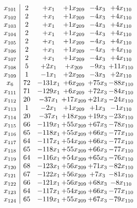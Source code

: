 \documentclass[11pt]{article}
\begin{document}
\[\begin{array}{c| c c@{\hskip 2pt} c@{\hskip 2pt} c@{\hskip 2pt} c@{\hskip 2pt} }
 x_{101}   &  2 & +  x_{1} & + 1 x_{209} & -4 x_{3} & + 4 x_{110}\\
 x_{102}   &  2 & +  x_{1} & + 1 x_{209} & -4 x_{3} & + 4 x_{110}\\
 x_{103}   &  2 & +  x_{1} & + 1 x_{209} & -4 x_{3} & + 4 x_{110}\\
 x_{104}   &  2 & +  x_{1} & + 1 x_{209} & -4 x_{3} & + 4 x_{110}\\
 x_{105}   &  2 & +  x_{1} & + 1 x_{209} & -4 x_{3} & + 4 x_{110}\\
 x_{106}   &  2 & +  x_{1} & + 1 x_{209} & -4 x_{3} & + 4 x_{110}\\
 x_{107}   &  2 & +  x_{1} & + 1 x_{209} & -4 x_{3} & + 4 x_{110}\\
 x_{108}   &  5 & + 2 x_{1} & +  x_{209} & -9 x_{3} & + 11 x_{110}\\
 x_{109}   &  1 & -1 x_{1} & + 2 x_{209} & -3 x_{3} & + 2 x_{110}\\
 x_{6}   &  72 & -131 x_{1} & + 6 x_{209} & + 75 x_{3} & -88 x_{110}\\
 x_{111}   &  71 & -129 x_{1} & + 6 x_{209} & + 72 x_{3} & -84 x_{110}\\
 x_{112}   &  20 & -37 x_{1} & + 17 x_{209} & + 21 x_{3} & -24 x_{110}\\
 x_{113}   &  1 & -2 x_{1} & + 1 x_{209} & + 1 x_{3} & -1 x_{110}\\
 x_{114}   &  20 & -37 x_{1} & + 18 x_{209} & + 19 x_{3} & -23 x_{110}\\
 x_{115}   &  66 & -119 x_{1} & + 55 x_{209} & + 67 x_{3} & -78 x_{110}\\
 x_{116}   &  65 & -118 x_{1} & + 55 x_{209} & + 66 x_{3} & -77 x_{110}\\
 x_{117}   &  64 & -117 x_{1} & + 54 x_{209} & + 66 x_{3} & -77 x_{110}\\
 x_{118}   &  65 & -118 x_{1} & + 55 x_{209} & + 66 x_{3} & -77 x_{110}\\
 x_{119}   &  64 & -116 x_{1} & + 54 x_{209} & + 65 x_{3} & -76 x_{110}\\
 x_{120}   &  68 & -123 x_{1} & + 56 x_{209} & + 71 x_{3} & -82 x_{110}\\
 x_{121}   &  67 & -122 x_{1} & + 56 x_{209} & + 7 x_{3} & -81 x_{110}\\
 x_{122}   &  66 & -121 x_{1} & + 56 x_{209} & + 68 x_{3} & -8 x_{110}\\
 x_{123}   &  64 & -117 x_{1} & + 54 x_{209} & + 66 x_{3} & -77 x_{110}\\
 x_{124}   &  65 & -119 x_{1} & + 55 x_{209} & + 67 x_{3} & -79 x_{110}\\

\end{array}\]
\end{document}
